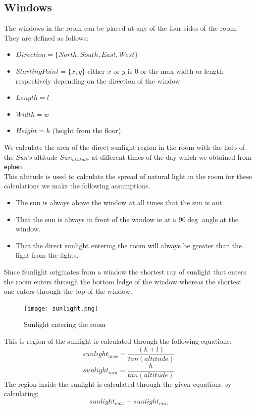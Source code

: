 \documentclass[conference]{IEEEtran}
\begin{document}
\subsection{Windows}
The windows in the room can be placed at any of the four sides of the room.
They are defined as follows:
\begin{itemize}
    \item $Direction = \{North, South, East, West\}$
    \item $Starting Point = \{x, y\}$ either $x$ or $y$ is 0 or the max width or length respectively depending on the direction of the window
    \item $Length = l$
    \item $Width = w$
    \item $Height = h$ (height from the floor)
\end{itemize}
We calculate the area of the direct sunlight region in the room with the help of the \textit{Sun's} altitude $Sun_{altitude}$ at different times of the day which we obtained from \texttt{ephem} \cite{ephem}.\\

This altitude is used to calculate the spread of natural light in the room for these calculations we make the following assumptions. 
\begin{itemize}
    \item The sun is always above the window at all times that the sun is out
    \item That the sun is always in front of the window ie at a \(90\deg\) angle at the window. 
    \item That the direct sunlight entering the room will always be greater than the light from the lights. 
\end{itemize}


Since Sunlight originates from a window the shortest ray of sunlight that enters the room enters through the bottom ledge of the window whereas the shortest one enters through the top of the window.\\ 

\begin{figure}
    \centering
    \texttt{[image: sunlight.png]}
    \caption{Sunlight entering the room}
    \label{fig:fill_vessel}
\end{figure}
This is region of the sunlight is calculated through the following equations:
\begin{equation}
    sunlight_{max} = \frac{(h + l)}{tan(altitude)}
\end{equation}
\begin{equation}
    sunlight_{min} = \frac{h}{tan(altitude)}
\end{equation}
The region inside the sunlight is calculated through the given equations by calculating:
\begin{equation*}
    sunlight_{max} - sunlight_{min}
\end{equation*}
\end{document}
